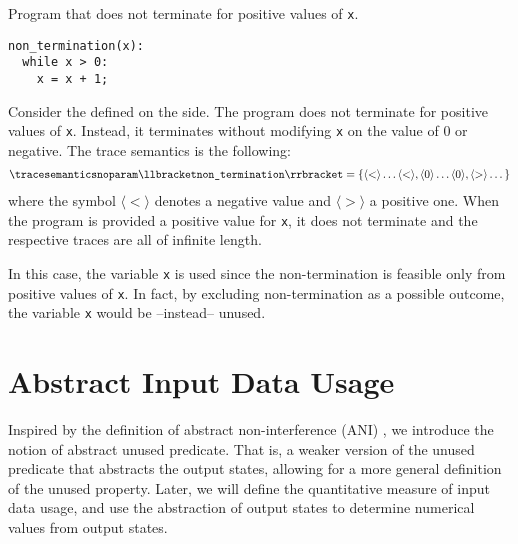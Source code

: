 \begin{example}
  \begin{marginlisting}
    \caption{Program that does not terminate for positive values of \texttt{x}.}
    \vspace{2\lineheight}
  \begin{lstlisting}
non_termination(x):
  while x > 0:
    x = x + 1;
\end{lstlisting}
  \end{marginlisting}
  Consider the  defined on the side. The program does not terminate for positive values of \texttt{x}. Instead, it terminates without modifying \texttt{x} on the value of $0$ or negative. The trace semantics is the following:
  \begin{align*}
    \tracesemanticsnoparam\semanticsof{\texttt{non\_termination}}
    =
    \{
      \langle{<}\rangle\dots\langle{<}\rangle,
      \langle{0}\rangle\dots\langle{0}\rangle,
      \langle{>}\rangle\dots
    \}
  \end{align*}
  where the symbol $\langle{<}\rangle$ denotes a negative value and $\langle{>}\rangle$ a positive one. When the program is provided a positive value for \texttt{x}, it does not terminate and the respective traces are all of infinite length.

  In this case, the variable \texttt{x} is used since the non-termination is feasible only from positive values of \texttt{x}.
  In fact, by excluding non-termination as a possible outcome, the variable \texttt{x} would be --instead-- unused.
\end{example}

\section{Abstract Input Data Usage}

Inspired by the definition of abstract non-interference (ANI) , we introduce the notion of abstract unused predicate.
That is, a weaker version of the unused predicate that abstracts the output states, allowing for a more general definition of the unused property.
Later, we will define the quantitative measure of input data usage, and use the abstraction of output states to determine numerical values from output states.


